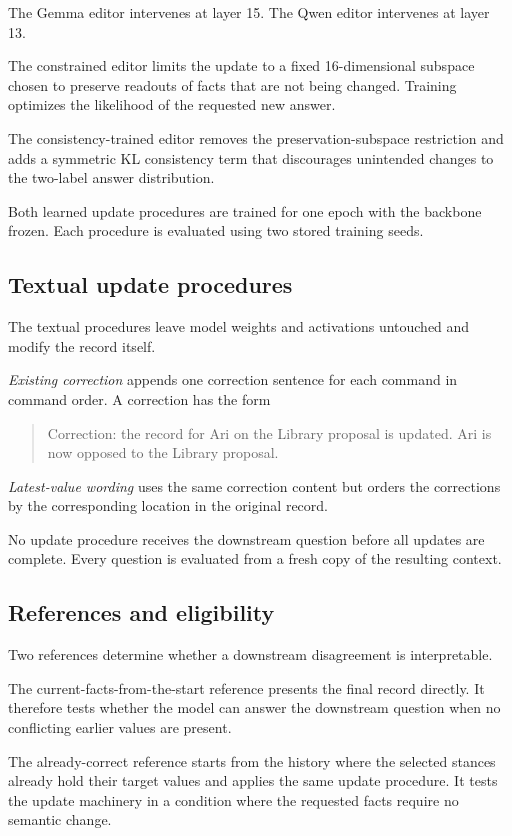 \documentclass{article}
\begin{document}
The Gemma editor intervenes at layer 15. The Qwen editor intervenes at
layer 13.

The constrained editor limits the update to a fixed 16-dimensional subspace
chosen to preserve readouts of facts that are not being changed. Training
optimizes the likelihood of the requested new answer.

The consistency-trained editor removes the preservation-subspace restriction
and adds a symmetric KL consistency term that discourages unintended changes
to the two-label answer distribution.

Both learned update procedures are trained for one epoch with the backbone
frozen. Each procedure is evaluated using two stored training seeds.

\subsection{Textual update procedures}

The textual procedures leave model weights and activations untouched and
modify the record itself.

\emph{Existing correction} appends one correction sentence for each command
in command order. A correction has the form

\begin{quote}
Correction: the record for Ari on the Library proposal is updated.
Ari is now opposed to the Library proposal.
\end{quote}

\emph{Latest-value wording} uses the same correction content but orders the
corrections by the corresponding location in the original record.

No update procedure receives the downstream question before all updates are
complete. Every question is evaluated from a fresh copy of the resulting
context.

\subsection{References and eligibility}

Two references determine whether a downstream disagreement is interpretable.

The current-facts-from-the-start reference presents the final record directly.
It therefore tests whether the model can answer the downstream question when
no conflicting earlier values are present.

The already-correct reference starts from the history where the selected
stances already hold their target values and applies the same update
procedure. It tests the update machinery in a condition where the requested
facts require no semantic change.
\end{document}
